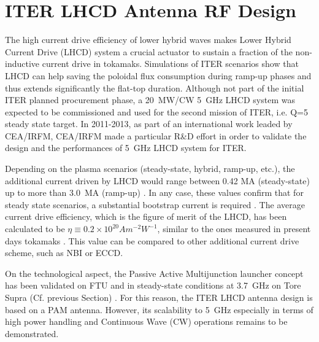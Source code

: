 \section{ITER LHCD Antenna RF Design}\label{sec:ITER_LHCD_antenna}
The high current drive efficiency of lower hybrid waves makes Lower Hybrid Current Drive (LHCD) system a crucial actuator to sustain a fraction of the non-inductive current drive in tokamaks. Simulations of ITER scenarios show that LHCD can help saving the poloidal flux consumption during ramp-up phases and thus extends significantly the flat-top duration. Although not part of the initial ITER planned procurement phase, a 20~MW/CW 5~GHz LHCD system was expected to be commissioned and used for the second mission of ITER, i.e. Q=5 steady state target. In 2011-2013, as part of an international work leaded by CEA/IRFM, CEA/IRFM made a particular R\&D effort in order to validate the design and the performances of 5~\si{GHz} LHCD system for ITER. 

Depending on the plasma scenarios (steady-state, hybrid, ramp-up, etc.), the additional current driven by LHCD would range between 0.42 MA (steady-state) up to more than 3.0~MA (ramp-up) . In any case, these values confirm that for steady state scenarios, a substantial bootstrap current is required . The average current drive efficiency, which is the figure of merit of the LHCD, has been calculated to be $\eta \equiv 0.2 \times 10^{20} \si{A m^{-2} W^{-1}}$, similar to the ones measured in present days tokamaks . This value  can be compared to other additional current drive scheme, such as NBI or ECCD. 

On the technological aspect, the Passive Active Multijunction launcher concept has been validated on FTU and in steady-state conditions at 3.7~\si{GHz} on Tore Supra (Cf. previous Section) . For this reason, the ITER LHCD antenna design is based on a PAM antenna. However, its scalability to 5~\si{GHz} especially in terms of high power handling and Continuous Wave (CW) operations remains to be demonstrated. 


